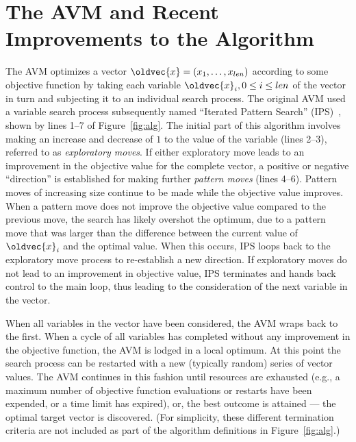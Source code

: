 \documentclass{llncs}
\let\vec\oldvec %
\newcommand{\inlineheading}[1]{\vspace{1mm} \noindent {\bf #1.}}
\begin{document}
\section{The AVM and Recent Improvements to the Algorithm}
\vspace{-1em}
\inlineheading{The original AVM} The AVM optimizes a vector $\vec{x} = (x_1, \dots, x_{len})$ according to some objective function by taking each variable $\vec{x}_i, 0 \leq i \leq len$ of the vector in turn and subjecting it to an individual search process. The original AVM used a variable search process subsequently named
``Iterated Pattern Search'' (IPS)~\cite{Kempka2013,Kempka2015}, shown by lines 1--7 of Figure~\ref{fig:alg}. The initial part of
this algorithm involves making an increase and decrease of $1$ to the value of the variable (lines 2--3), referred to as
{\it exploratory moves}. If either exploratory move leads to an improvement in the objective value for the complete
vector, a positive or negative ``direction'' is established for making further {\it pattern moves} (lines 4--6). Pattern
moves of increasing size continue to be made while the objective value improves. When a pattern move does not improve
the objective value compared to the previous move, the search has likely overshot the optimum, due to a pattern move
that was larger than the difference between the current value of $\vec{x}_i$ and the optimal value. When this occurs,
IPS loops back to the exploratory move process to re-establish a new direction. If exploratory moves do not lead to an
improvement in objective value, IPS terminates and hands back control to the main loop, thus leading to the consideration of the next variable in the vector.

When all variables in the vector have been considered, the AVM wraps back to the first. When a cycle of all variables has completed without any improvement in the objective function, the AVM is lodged in a local optimum. At this point the search process can be restarted with a new (typically random) series of vector values. The AVM continues in this fashion until resources are exhausted (e.g., a maximum number of objective function evaluations or restarts have been expended, or a time limit has expired), or, the best outcome is attained --- the optimal target vector is discovered. (For simplicity, these different termination criteria are not included as part of the algorithm definitions in Figure~\ref{fig:alg}.)
\end{document}
